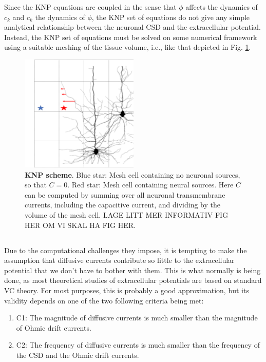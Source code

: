 Since the KNP equations are coupled in the sense that $\phi$ affects the dynamics of $c_k$ and $c_k$ the dynamics of $\phi$, the KNP set of equations do not give any simple analytical relationship between the neuronal CSD and the extracellular potential. Instead, the KNP set of equations must be solved on some numerical framework using a suitable meshing of the tissue volume, i.e., like that depicted in Fig. \ref{Eldiff:fig:KNPmesh}.

\begin{figure}[!ht]
\begin{center}
\includegraphics[width=0.5\textwidth]{Figures/Eldiff/KNP.png}
\end{center}
\caption{\textbf{KNP scheme}. Blue star: Mesh cell containing no neuronal sources, so that $C=0$. Red star: Mesh cell containing neural sources. Here $C$ can be computed by summing over all neuronal transmembrane currents, including the capacitive current, and dividing by the volume of the mesh cell. LAGE LITT MER INFORMATIV FIG HER OM VI SKAL HA FIG HER.}
\label{Eldiff:fig:KNPmesh}
\end{figure}


\subsection{}
Due to the computational challenges they impose, it is tempting to make the assumption that diffusive currents contribute so little to the extracellular potential that we don't have to bother with them. This is what normally is being done, as most theoretical studies of extracellular potentials are based on standard VC theory. For most purposes, this is probably a good approximation, but its validity depends on one of the two following criteria being met:

\begin{enumerate}
\item C1: The magnitude of diffusive currents is much smaller than the magnitude of Ohmic drift currents.
\item C2: The frequency of diffusive currents is much smaller than the frequency of the CSD and the Ohmic drift currents. 
\end{enumerate}

